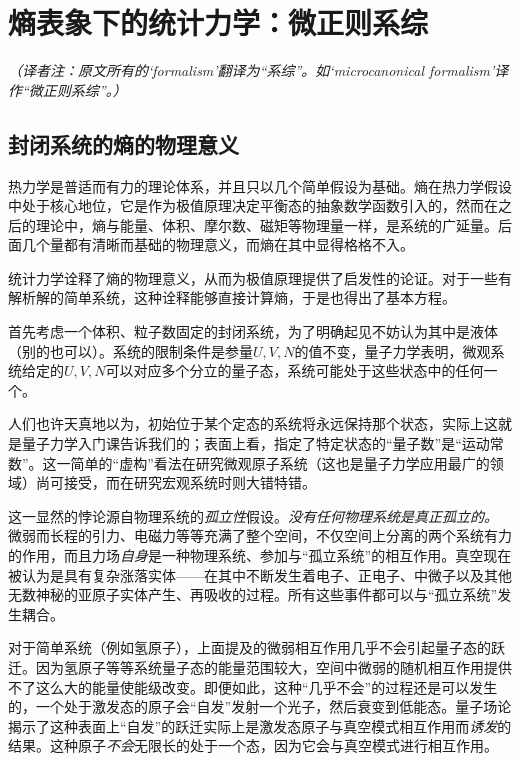 \chapter{熵表象下的统计力学：微正则系综}
\label{chap15}
{\it （译者注：原文所有的`formalism'翻译为“系综”。如`microcanonical formalism'译作“微正则系综”。）}

\section{封闭系统的熵的物理意义}
热力学是普适而有力的理论体系，并且只以几个简单假设为基础。熵在热力学假设中处于核心地位，它是作为极值原理决定平衡态的抽象数学函数引入的，然而在之后的理论中，熵与能量、体积、摩尔数、磁矩等物理量一样，是系统的广延量。后面几个量都有清晰而基础的物理意义，而熵在其中显得格格不入。

统计力学诠释了熵的物理意义，从而为极值原理提供了启发性的论证。对于一些有解析解的简单系统，这种诠释能够直接计算熵，于是也得出了基本方程。

首先考虑一个体积、粒子数固定的封闭系统，为了明确起见不妨认为其中是液体（别的也可以）。系统的限制条件是参量$U, V, N$的值不变，量子力学表明，微观系统给定的$U, V, N$可以对应多个分立的量子态，系统可能处于这些状态中的任何一个。

人们也许天真地以为，初始位于某个定态的系统将永远保持那个状态，实际上这就是量子力学入门课告诉我们的；表面上看，指定了特定状态的“量子数”是“运动常数”。这一简单的“虚构”看法在研究微观原子系统（这也是量子力学应用最广的领域）尚可接受，而在研究宏观系统时则大错特错。

这一显然的悖论源自物理系统的{\it 孤立性}假设。{\it 没有任何物理系统是真正孤立的。} 微弱而长程的引力、电磁力等等充满了整个空间，不仅空间上分离的两个系统有力的作用，而且力场{\it 自身}是一种物理系统、参加与“孤立系统”的相互作用。真空现在被认为是具有复杂涨落实体——在其中不断发生着电子、正电子、中微子以及其他无数神秘的亚原子实体产生、再吸收的过程。所有这些事件都可以与“孤立系统”发生耦合。

对于简单系统（例如氢原子），上面提及的微弱相互作用几乎不会引起量子态的跃迁。因为氢原子等等系统量子态的能量范围较大，空间中微弱的随机相互作用提供不了这么大的能量使能级改变。即便如此，这种“几乎不会”的过程还是可以发生的，一个处于激发态的原子会“自发”发射一个光子，然后衰变到低能态。量子场论揭示了这种表面上“自发”的跃迁实际上是激发态原子与真空模式相互作用而{\it 诱发}的结果。这种原子{\it 不会}无限长的处于一个态，因为它会与真空模式进行相互作用。

